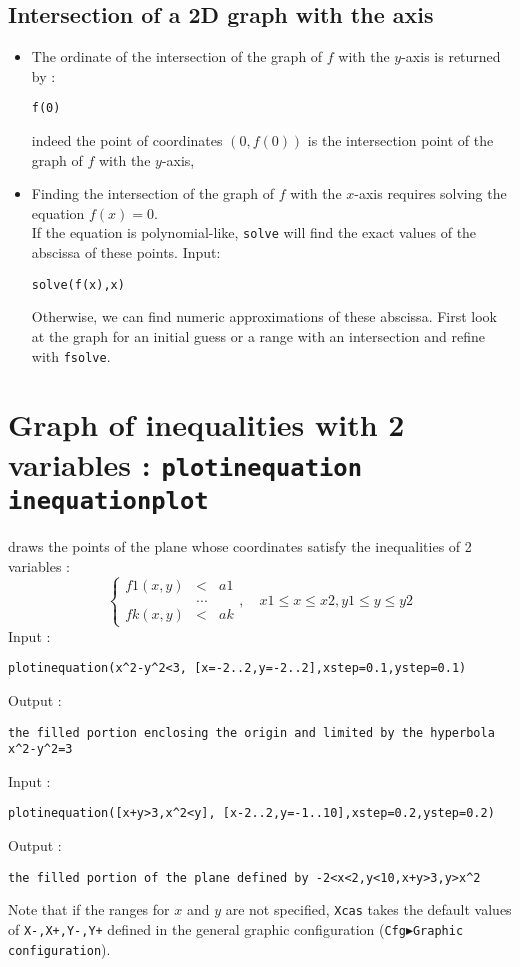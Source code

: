 \documentclass[a4paper,11pt]{book}
\begin{document}
\subsection{Intersection of a 2D graph with the axis}
\begin{itemize}
\item The ordinate of the intersection of the graph of $f$ with the 
$y$-axis is returned by :
\begin{center}{\tt f(0)}\end{center}
indeed the point of coordinates $(0,f(0))$ is the intersection point of the 
graph of $f$ with the $y$-axis,
\item Finding the intersection of the graph of $f$ with the $x$-axis 
requires solving the equation $f(x)=0$. \\
If the equation is polynomial-like, {\tt solve} will find
the exact values of the abscissa of these points. Input:
\begin{center}{\tt solve(f(x),x)}\end{center}
Otherwise, we can find numeric approximations of these 
abscissa. First look at the graph for an initial guess or a
range with an intersection and refine with {\tt fsolve}.
\end{itemize}

\section{Graph of inequalities with 2 variables : {\tt plotinequation inequationplot}}
draws the points of the plane whose coordinates
satisfy the inequalities of 2 variables :
\[ \left\{ \begin{array}{ccc}
f1(x,y) &<&a1 \\
& ... & \\
fk(x,y)&<&ak 
\end{array}\right., \quad
x1\leq x \leq x2, y1 \leq y \leq y2 \]
Input :
\begin{center}{\tt plotinequation(x\verb|^|2-y\verb|^|2<3, [x=-2..2,y=-2..2],xstep=0.1,ystep=0.1)}\end{center}
Output :
\begin{center}{\tt the filled portion enclosing the origin and limited by the hyperbola x\verb|^|2-y\verb|^|2=3}\end{center}
Input :
\begin{center}{\tt plotinequation([x+y>3,x\verb|^|2<y], [x-2..2,y=-1..10],xstep=0.2,ystep=0.2)}\end{center}
Output :
\begin{center}{\tt the filled portion of the plane defined by -2<x<2,y<10,x+y>3,y>x\verb|^|2}\end{center}
Note that if the ranges for $x$ and $y$ are not specified, 
{\tt Xcas} takes the default values of 
{\tt X-,X+,Y-,Y+} defined in the general graphic configuration
({\tt Cfg$\blacktriangleright$Graphic configuration}).
\end{document}
